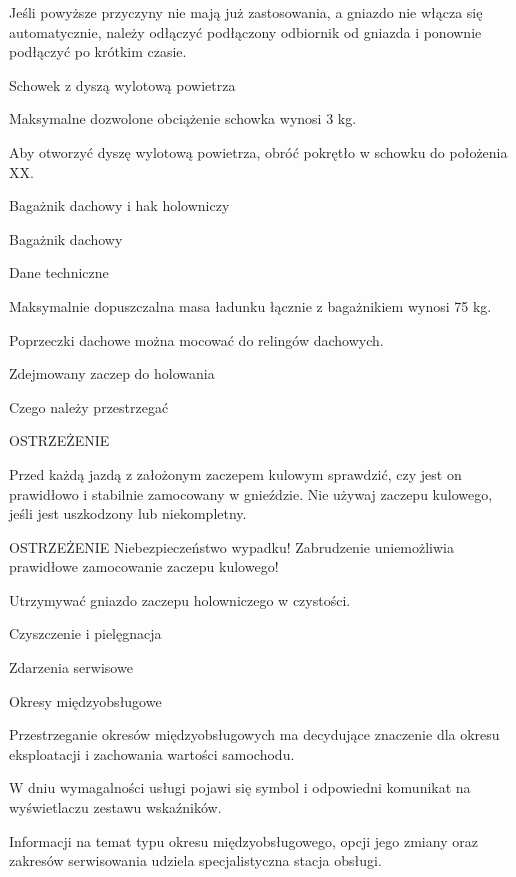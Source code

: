 \begin{itemizeArrow}
	\itemArrow Jeśli powyższe przyczyny nie mają już zastosowania, a gniazdo nie włącza się automatycznie, należy odłączyć podłączony odbiornik od gniazda i ponownie podłączyć po krótkim czasie.
\end{itemizeArrow}

Schowek z dyszą wylotową powietrza

Maksymalne dozwolone obciążenie schowka wynosi 3 kg.
\begin{itemizeArrow}
	\itemArrow Aby otworzyć dyszę wylotową powietrza, obróć pokrętło w schowku do położenia XX.
\end{itemizeArrow}

Bagażnik dachowy i hak holowniczy

Bagażnik dachowy

Dane techniczne

Maksymalnie dopuszczalna masa ładunku łącznie z bagażnikiem wynosi 75 kg.

Poprzeczki dachowe można mocować do relingów dachowych.

Zdejmowany zaczep do holowania

Czego należy przestrzegać

OSTRZEŻENIE
\begin{itemizeTriangle}
	\itemTriangle Przed każdą jazdą z założonym zaczepem kulowym sprawdzić, czy jest on prawidłowo i stabilnie zamocowany w gnieździe.
	\itemTriangle Nie używaj zaczepu kulowego, jeśli jest uszkodzony lub niekompletny.
\end{itemizeTriangle}

OSTRZEŻENIE
Niebezpieczeństwo wypadku!
Zabrudzenie uniemożliwia prawidłowe zamocowanie zaczepu kulowego!
\begin{itemizeTriangle}
	\itemTriangle Utrzymywać gniazdo zaczepu holowniczego w czystości.
\end{itemizeTriangle}

Czyszczenie i pielęgnacja

Zdarzenia serwisowe

Okresy międzyobsługowe

Przestrzeganie okresów międzyobsługowych ma decydujące znaczenie dla okresu eksploatacji i zachowania wartości samochodu.

W dniu wymagalności usługi pojawi się symbol i odpowiedni komunikat na wyświetlaczu zestawu wskaźników.

Informacji na temat typu okresu międzyobsługowego, opcji jego zmiany oraz zakresów serwisowania udziela specjalistyczna stacja obsługi.

